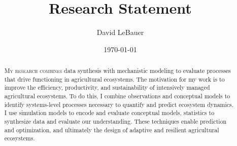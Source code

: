 \documentclass[english]{tufte-handout}
\title[LeBauer Research Statement]{Research Statement}
\author{David LeBauer}
\date{\today}
\providecommand\mynewthought[1]{%
   \addvspace{0.5em}%
   \noindent\hspace{-0.5em}\textsc{#1} %
}
\begin{document}
\maketitle

\begin{fullwidth}

\vspace{1.15em}

\begin{abstract}






\mynewthought{My research combines} data synthesis with mechanistic modeling to evaluate processes that drive functioning in agricultural ecosystems.
 The motivation for my work is to improve the efficiency, productivity, and sustainability of intensively managed agricultural ecosystems.
 To do this, I combine observations and conceptual models to identify systems-level processes necessary to quantify and predict ecosystem dynamics.
 I use simulation models to encode and evaluate conceptual models, statistics to synthesize data and evaluate our understanding.
 These techniques enable prediction and optimization, and ultimately the design of adaptive and resilient agricultural ecosystems.
 

\end{abstract}
\end{fullwidth}
\end{document}
